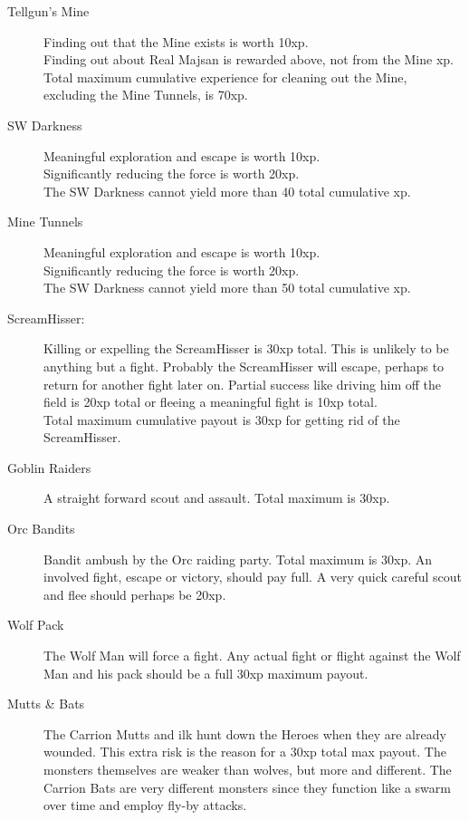 \begin{description}
\item[Tellgun's Mine]
Finding out that the Mine exists is worth 10xp.\\
Finding out about Real Majsan is rewarded above, not from the Mine xp.\\
Total maximum cumulative experience for cleaning out the Mine, excluding the Mine Tunnels, is 70xp.

\item[SW Darkness] Meaningful exploration and escape is worth 10xp.\\
Significantly reducing the force is worth 20xp.\\
The SW Darkness cannot yield more than 40 total cumulative xp.

\item[Mine Tunnels] Meaningful exploration and escape is worth 10xp.\\
Significantly reducing the force is worth 20xp.\\
The SW Darkness cannot yield more than 50 total cumulative xp.

\item[ScreamHisser:] Killing or expelling the ScreamHisser is 30xp total. This is unlikely to be anything but a fight. Probably the ScreamHisser will escape, perhaps to return for another fight later on.  Partial success like driving him off the field is 20xp total or fleeing a meaningful fight is 10xp total.\\
Total maximum cumulative payout is 30xp for getting rid of the ScreamHisser.

\item[Goblin Raiders] A straight forward scout and assault.
Total maximum is 30xp.

\item[Orc Bandits] Bandit ambush by the Orc raiding party.
Total maximum is 30xp. An involved fight, escape or victory, should pay full. A very quick careful scout and flee should perhaps be 20xp.

\item[Wolf Pack] The Wolf Man will force a fight. Any actual fight or flight against the Wolf Man and his pack should be a full 30xp maximum payout.

\item[Mutts \& Bats]
The Carrion Mutts and ilk hunt down the Heroes when they are already wounded. This extra risk is the reason for a 30xp total max payout. The monsters themselves are weaker than wolves, but more and different. The Carrion Bats are very different monsters since they function like a swarm over time and employ fly-by attacks.

\end{description}

